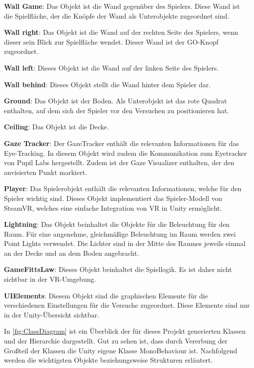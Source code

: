 \begin{description}
	\item \textbf{Wall Game}: Das Objekt ist die Wand gegenüber des Spielers. Diese Wand ist die Spielfläche, der die Knöpfe der Wand als Unterobjekte zugeordnet sind.
	\item \textbf{Wall right}: Das Objekt ist die Wand auf der rechten Seite des Spielers, wenn dieser sein Blick zur Spielfläche wendet. Dieser Wand ist der GO-Knopf zugeordnet.
	\item \textbf{Wall left}: Dieses Objekt ist die Wand auf der linken Seite des Spielers.
	\item \textbf{Wall behind}: Dieses Objekt stellt die Wand hinter dem Spieler dar.
	\item \textbf{Ground}: Das Objekt ist der Boden. Als Unterobjekt ist das rote Quadrat enthalten, auf dem sich der Spieler vor den Versuchen zu positionieren hat.
	\item \textbf{Ceiling}: Das Objekt ist die Decke.
	\item \textbf{Gaze Tracker}: Der GazeTracker enthält die relevanten Informationen für das Eye-Tracking. In diesem Objekt wird zudem die Kommunikation zum Eyetracker von Pupil Labs hergestellt. Zudem ist der Gaze Visualizer enthalten, der den anvisierten Punkt markiert.
	\item \textbf{Player}: Das Spielerobjekt enthält die relevanten Informationen, welche für den Spieler wichtig sind. Dieses Objekt implementiert das Spieler-Modell von SteamVR, welches eine einfache Integration von VR in Unity ermöglicht.
	\item \textbf{Lightning}: Das Objekt beinhaltet die Objekte für die Beleuchtung für den Raum. Für eine angenehme, gleichmäßige Beleuchtung im Raum werden zwei Point Lights verwendet. Die Lichter sind in der Mitte des Raumes jeweils einmal an der Decke und an dem Boden angebracht. 
	\item \textbf{GameFittsLaw}: Dieses Objekt beinhaltet die Spiellogik. Es ist daher nicht sichtbar in der \ac{VR}-Umgebung.
	\item \textbf{UIElements}: Diesem Objekt sind die graphischen Elemente für die verschiedenen Einstellungen für die Versuche zugeordnet. Diese Elemente sind nur in der Unity-Übersicht sichtbar. 
\end{description}

In \autoref{fig:ClassDiagram} ist ein Überblick der für dieses Projekt generierten Klassen und der Hierarchie dargestellt. Gut zu sehen ist, dass durch Vererbung der Großteil der Klassen die Unity eigene Klasse MonoBehaviour ist. Nachfolgend werden die wichtigsten Objekte beziehungsweise Strukturen erläutert. 

